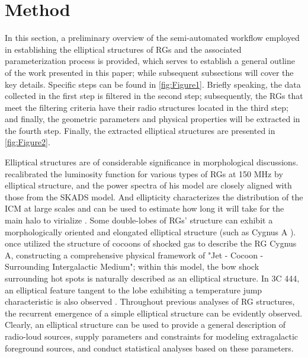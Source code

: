 \documentclass{aa}
\begin{document}
\label{sec:Data}



\section{Method}\label{sec:Method}

In this section, a preliminary overview of the semi-automated workflow employed in establishing the elliptical structures of RGs and the associated parameterization process is provided, which serves to establish a general outline of the work presented in this paper; while subsequent subsections will cover the key details. Specific steps can be found in \autoref{fig:Figure1}. Briefly speaking, the data collected in the first step is filtered in the second step; subsequently, the RGs that meet the filtering criteria have their radio structures located in the third step; and finally, the geometric parameters and physical properties will be extracted in the fourth step. Finally, the extracted elliptical structures are presented in \autoref{fig:Figure2}.

Elliptical structures are of considerable significance in morphological discussions. \cite{lin_new_2024} recalibrated the luminosity function for various types of RGs at 150 MHz by elliptical structure, and the power spectra of his model are closely aligned with those from the SKADS model. And ellipticity characterizes the distribution of the ICM at large scales and can be used to estimate how long it will take for the main halo to virialize \citep{ghirardini_erosita_2022}. Some double-lobes of RGs' structure can exhibit a morphologically oriented and elongated elliptical structure (such as Cygnus A \citep{carilli_cygnus_1996}). \cite{begelman_overpressured_1989} once utilized the structure of cocoons of shocked gas to describe the RG Cygnus A, constructing a comprehensive physical framework of "Jet - Cocoon - Surrounding Intergalactic Medium"; within this model, the bow shock surrounding hot spots is naturally described as an elliptical structure. In 3C 444, an elliptical feature tangent to the lobe exhibiting a temperature jump characteristic is also observed \citep{croston_large-scale_2011}. Throughout previous analyses of RG structures, the recurrent emergence of a simple elliptical structure can be evidently observed. Clearly, an elliptical structure can be used to provide a general description of radio-loud sources, supply parameters and constraints for modeling extragalactic foreground sources, and conduct statistical analyses based on these parameters.
\end{document}
